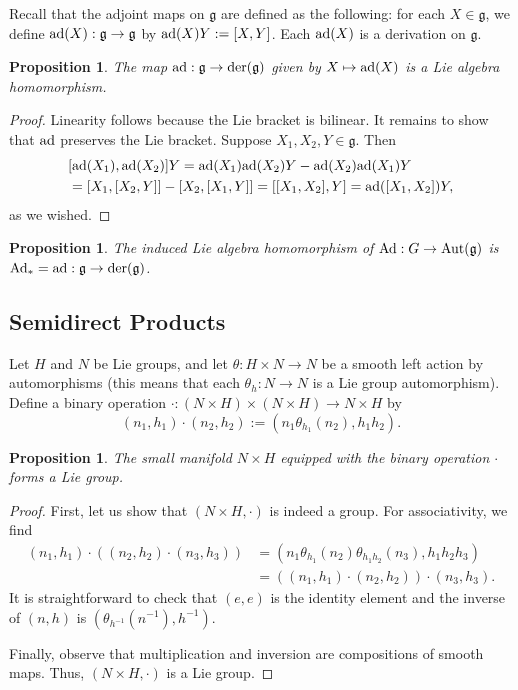 \documentclass{amsart}
\newcommand{\der}{\text{\normalfont der}}
\newcommand{\aut}{\text{\normalfont Aut}}
\newcommand{\Ad}{\text{\normalfont Ad}}
\newcommand{\ad}{\text{\normalfont ad}}
\newcommand{\g}{\mathfrak g}
\theoremstyle{plain}
\newtheorem{proposition}[theorem]{Proposition}
\theoremstyle{definition}
\theoremstyle{remark}
\begin{document}
	Recall that the adjoint maps on $\g$ are defined as the following: for each $X \in \g$, we define $\ad(X):\g \rightarrow \g$ by $\ad(X)Y := [X,Y]$. Each $\ad(X)$ is a derivation on $\g$.
	
	\begin{proposition}
		The map $\ad:\g \rightarrow \der(\g)$ given by $X \mapsto \ad(X)$ is a Lie algebra homomorphism.
	\end{proposition}
	\begin{proof}
		Linearity follows because the Lie bracket is bilinear. It remains to show that $\ad$ preserves the Lie bracket. Suppose $X_1,X_2,Y \in \g$. Then 
		\begin{align*}
			&[\ad(X_1),\ad(X_2)]Y = \ad(X_1)\ad(X_2)Y - \ad(X_2) \ad(X_1) Y \\
			&= [X_1,[X_2,Y]]  - [X_2, [X_1,Y]] = [[X_1,X_2],Y] = \ad([X_1,X_2])Y,
		\end{align*}
		as we wished.
	\end{proof}

	\begin{proposition}
		The induced Lie algebra homomorphism of $\Ad: G \rightarrow \aut(\g)$ is $\Ad_* = \ad: \g \rightarrow \der(\g)$.
	\end{proposition}
	
	
	\subsection{Semidirect Products}
	Let $H$ and $N$ be Lie groups, and let $\theta:H \times N \rightarrow N$ be a smooth left action by automorphisms (this means that each $\theta_h:N \rightarrow N$ is a Lie group automorphism). Define a binary operation $\cdot:(N \times H) \times (N \times H) \rightarrow N \times H$ by 
	$$(n_1,h_1) \cdot (n_2,h_2) := (n_1 \theta_{h_1}(n_2), h_1h_2).$$
	\begin{proposition}
		The small manifold $N \times H$ equipped with the binary operation $\cdot$ forms a Lie group.
	\end{proposition}
	\begin{proof}
		First, let us show that $(N \times H,\cdot)$ is indeed a group. For associativity, we find 
		\begin{align*}
			(n_1,h_1) \cdot((n_2,h_2) \cdot(n_3,h_3)) &= (n_1 \theta_{h_1}(n_2) \theta_{h_1h_2}(n_3),h_1h_2h_3) \\
			&= ((n_1,h_1) \cdot (n_2,h_2)) \cdot (n_3,h_3).
		\end{align*}
		It is straightforward to check that $(e,e)$ is the identity element and the inverse of $(n,h)$ is $(\theta_{h^{-1}}(n^{-1}), h^{-1})$. 
		
		Finally, observe that multiplication and inversion are compositions of smooth maps. Thus, $(N \times H,\cdot)$ is a Lie group.
	\end{proof}
	
\end{document}
